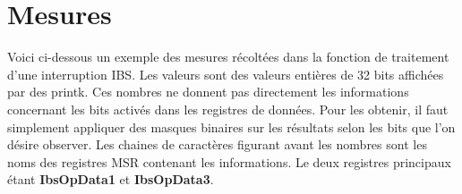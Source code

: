   \section{Mesures}
    
    Voici ci-dessous un exemple des mesures récoltées dans la fonction de
    traitement d'une interruption IBS. Les valeurs sont des valeurs entières de
    32 bits affichées par des printk. Ces nombres ne donnent pas directement les
    informations concernant les bits activés dans les registres de données. Pour
    les obtenir, il faut simplement appliquer des masques binaires sur les
    résultats selon les bits que l'on désire observer. Les chaines de caractères
    figurant avant les nombres sont les noms des registres MSR contenant les
    informations. Le deux registres principaux étant \textbf{IbsOpData1} et
    \textbf{IbsOpData3}.

